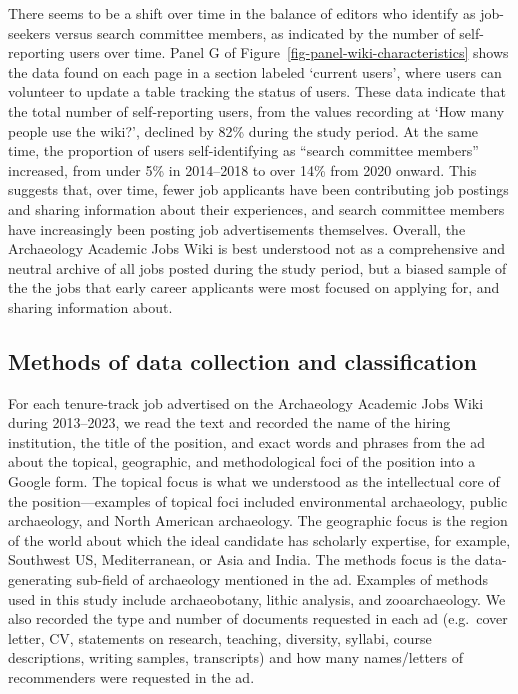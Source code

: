 \documentclass[
  12pt,
]{article}
\begin{document}
There seems to be a shift over time in the balance of editors who
identify as job-seekers versus search committee members, as indicated by
the number of self-reporting users over time. Panel G of
Figure~\ref{fig-panel-wiki-characteristics} shows the data found on each
page in a section labeled `current users', where users can volunteer to
update a table tracking the status of users. These data indicate that
the total number of self-reporting users, from the values recording at
`How many people use the wiki?', declined by 82\% during the study
period. At the same time, the proportion of users self-identifying as
``search committee members'' increased, from under 5\% in 2014--2018 to
over 14\% from 2020 onward. This suggests that, over time, fewer job
applicants have been contributing job postings and sharing information
about their experiences, and search committee members have increasingly
been posting job advertisements themselves. Overall, the Archaeology
Academic Jobs Wiki is best understood not as a comprehensive and neutral
archive of all jobs posted during the study period, but a biased sample
of the the jobs that early career applicants were most focused on
applying for, and sharing information about.

\subsection{Methods of data collection and
classification}\label{methods-of-data-collection-and-classification}

For each tenure-track job advertised on the Archaeology Academic Jobs
Wiki during 2013--2023, we read the text and recorded the name of the
hiring institution, the title of the position, and exact words and
phrases from the ad about the topical, geographic, and methodological
foci of the position into a Google form. The topical focus is what we
understood as the intellectual core of the position---examples of
topical foci included environmental archaeology, public archaeology, and
North American archaeology. The geographic focus is the region of the
world about which the ideal candidate has scholarly expertise, for
example, Southwest US, Mediterranean, or Asia and India. The methods
focus is the data-generating sub-field of archaeology mentioned in the
ad. Examples of methods used in this study include archaeobotany, lithic
analysis, and zooarchaeology. We also recorded the type and number of
documents requested in each ad (e.g.~cover letter, CV, statements on
research, teaching, diversity, syllabi, course descriptions, writing
samples, transcripts) and how many names/letters of recommenders were
requested in the ad.
\end{document}
